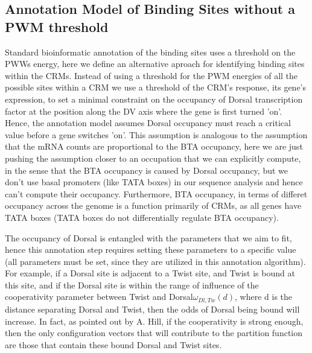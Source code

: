 \subsection{Annotation Model of Binding Sites without a PWM threshold}

Standard bioinformatic annotation of the binding sites uses a threshold on the PWWs energy, here we define an alternative aproach for identifying binding sites within the CRMs.  Instead of using a threshold for the PWM energies of all the possible sites within a CRM we use a threshold of the CRM's response, its gene's expression, to set a minimal constraint on the occupancy of Dorsal transcription factor at the position along the DV axis where the gene is first turned 'on'.  Hence, the annotation model assumes Dorsal occupancy must reach a critical value before a gene switches 'on'.  This assumption is analogous to the assumption that the mRNA counts are proportional to the BTA occupancy, here we are just pushing the assumption closer to an occupation that we can explicitly compute, in the sense that the BTA occupancy is caused by Dorsal occupancy, but we don't use basal promoters (like TATA boxes) in our sequence analysis and hence can't compute their occupancy.  Furthermore, BTA occupancy, in terms of differet occupancy across the genome is a function primarily of CRMs, as all genes have TATA boxes (TATA boxes do not differentially regulate BTA occupancy).  

The occupancy of Dorsal is entangled with the parameters that we aim to fit, hence this annotation step requires setting these parameters to a specific value (all parameters must be set, since they are utilized in this annotation algorithm).  For example, if a Dorsal site is adjacent to a Twist site, and Twist is bound at this site, and if the Dorsal site is within the range of influence of the cooperativity parameter between Twist and Dorsal$\omega_{Dl,Tw}(d)$, where d is the distance separating Dorsal and Twist, then the odds of Dorsal being bound will increase.  In fact, as pointed out by A. Hill, if the cooperativity is strong enough, then the only configuration vectors that will contribute to the partition function are those that contain these bound Dorsal and Twist sites.  
%

